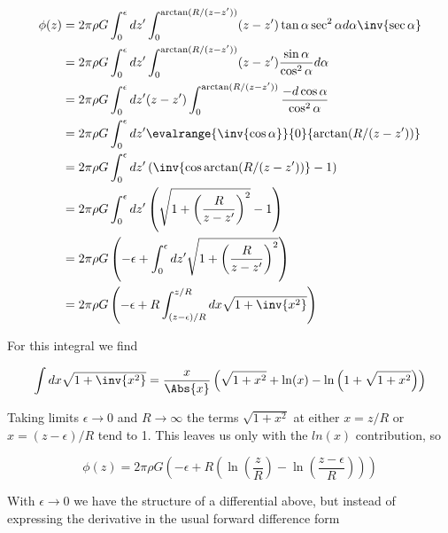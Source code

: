\begin{align*}
\phi(z) 
&= 
2 \pi \rho G \int_0^\epsilon dz' \int_0^{\arctan(R/(z-z'))} (z - z') \tan \alpha \sec^2 \alpha d\alpha \inv{ \sec\alpha} \\
&= 
2 \pi \rho G \int_0^\epsilon dz' \int_0^{\arctan(R/(z-z'))} (z - z') \frac{\sin \alpha}{\cos^2\alpha} d\alpha \\
&= 
2 \pi \rho G \int_0^\epsilon dz' (z - z')\int_0^{\arctan(R/(z-z'))} \frac{-d\cos \alpha}{\cos^2\alpha} \\
&= 
2 \pi \rho G \int_0^\epsilon dz' \evalrange{\inv{\cos\alpha}}{0}{\arctan(R/(z-z'))} \\
&= 
2 \pi \rho G \int_0^\epsilon dz' \left( \inv{\cos\arctan(R/(z-z'))} -1 \right) \\
&= 
2 \pi \rho G \int_0^\epsilon dz' \left( \sqrt{1 + \left(\frac{R}{z-z'}\right)^2} -1 \right) \\
&=
2 \pi \rho G 
\left( -\epsilon +
\int_0^\epsilon dz' 
\sqrt{1 + \left(\frac{R}{z-z'}\right)^2} \right)  \\
&=
2 \pi \rho G 
\left( -\epsilon + R
\int_{(z - \epsilon)/R}^{z/R} dx
\sqrt{1 + \inv{x^2}}
\right)
\end{align*}

For this integral we find

\begin{equation}\label{eqn:classicalMechanicsPs2:270}
\int dx \sqrt{1 + \inv{x^2}} 
=
\frac{x}{\Abs{x}}
\left(\sqrt{1+x^2}+\ln(x)-\ln\left(1+\sqrt{1+x^2}\right)\right)
\end{equation}

Taking limits $\epsilon \rightarrow 0$ and $R \rightarrow \infty$ the terms
$\sqrt{1 + x^2}$ at either $x = z/R$ or $x = (z-\epsilon)/R$ tend to 1.  This leaves us only with the $ln(x)$ contribution, so

\begin{equation}\label{eqn:classicalMechanicsPs2:290}
\phi(z) =
2 \pi \rho G 
\left( -\epsilon + R \left( 
\ln\left(\frac{z}{R}\right) -\ln\left(\frac{z - \epsilon}{R}\right) \right)\right)
\end{equation}

With $\epsilon \rightarrow 0$ we have the structure of a differential above, but instead of expressing the derivative in the usual forward difference form

